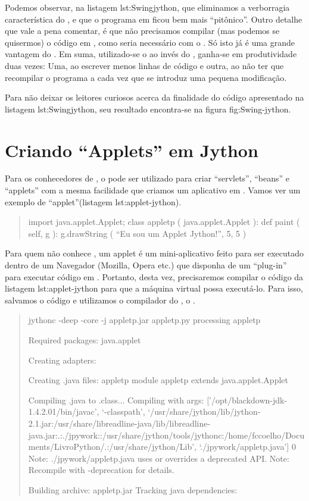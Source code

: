 \documentclass[a4paper,10pt,brazil]{sphinxmanual}
\begin{document}
Podemos observar, na listagem lst:Swingjython, que eliminamos a
verborragia característica do , e que o programa em
 ficou bem mais ``pitônico''. Outro detalhe que vale a pena
comentar, é que não precisamos compilar (mas podemos se quisermos)
o código em , como seria necessário com o . Só
isto já é uma grande vantagem do . Em suma, utilizado-se
o  ao invés do , ganha-se em produtividade duas
vezes: Uma, ao escrever menos linhas de código e outra, ao não ter
que recompilar o programa a cada vez que se introduz uma pequena
modificação.

Para não deixar os leitores curiosos acerca da finalidade do código
apresentado na listagem lst:Swingjython, seu resultado encontra-se
na figura fig:Swing-jython.


\section{Criando ``Applets'' em Jython}
\label{capext:criando-applets-em-jython}
Para os conhecedores de , o  pode ser utilizado
para criar ``servlets'', ``beans'' e ``applets'' com a mesma facilidade
que criamos um aplicativo em . Vamos ver um exemplo de
``applet''(listagem lst:applet-jython).
\begin{quote}

import java.applet.Applet; class appletp ( java.applet.Applet ):
def paint ( self, g ): g.drawString ( ``Eu sou um Applet Jython!'',
5, 5 )
\end{quote}

Para quem não conhece , um applet é um mini-aplicativo
feito para ser executado dentro de um Navegador (Mozilla, Opera
etc.) que disponha de um ``plug-in'' para executar código em
. Portanto, desta vez, precisaremos compilar o código da
listagem lst:applet-jython para que a máquina virtual 
possa executá-lo. Para isso, salvamos o código e utilizamos o
compilador do , o .
\begin{quote}

jythonc -deep -core -j appletp.jar appletp.py processing appletp

Required packages: java.applet

Creating adapters:

Creating .java files: appletp module appletp extends
java.applet.Applet

Compiling .java to .class... Compiling with args:
{[}'/opt/blackdown-jdk-1.4.2.01/bin/javac', `-classpath',
`/usr/share/jython/lib/jython-2.1.jar:/usr/share/libreadline-java/lib/libreadline-java.jar:.:./jpywork::/usr/share/jython/tools/jythonc:/home/fccoelho/Documents/LivroPython/.:/usr/share/jython/Lib',
`./jpywork/appletp.java'{]} 0 Note: ./jpywork/appletp.java uses or
overrides a deprecated API. Note: Recompile with -deprecation for
details.

Building archive: appletp.jar Tracking java dependencies:
\end{quote}
\end{document}
